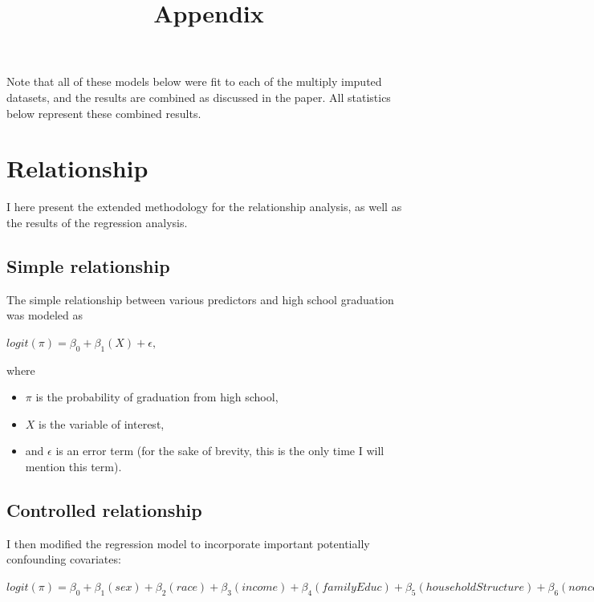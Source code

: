 \documentclass[11pt]{article}
\begin{document}
\setcounter{page}{23}
\title{Appendix}
\date{\vspace{-5ex}}
\maketitle{}

Note that all of these models below were fit to each of the multiply imputed datasets, and the results are combined as discussed in the paper. All statistics below represent these combined results.

\section{Relationship}
I here present the extended methodology for the relationship analysis, as well as the results of the regression analysis.

\subsection{Simple relationship}
The simple relationship between various predictors and high school graduation was modeled as

\vspace{5mm}
$ logit(\pi) = \beta_0 + \beta_1(X) + \epsilon, $
\vspace{5mm}

\noindent where

\begin{itemize} \itemsep1pt \parskip0pt 
	\item $\pi$ is the probability of graduation from high school,
	\item $X$ is the variable of interest,
	\item and $\epsilon$ is an error term (for the sake of brevity, this is the only time I will mention this term).
\end{itemize}

\subsection{Controlled relationship}
I then modified the regression model to incorporate important potentially confounding covariates:

\vspace{5mm}
$ logit(\pi) = \beta_0 + \beta_1(sex) + \beta_2(race) + \beta_3(income) + \beta_4(familyEduc) + \beta_5(householdStructure)+ \beta_6(noncognitive) + \epsilon, $
\vspace{5mm}
\end{document}
